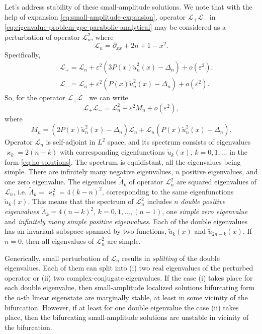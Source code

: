 Let's address stability of these small-amplitude solutions.
We note that with the help of expansion \eqref{eq:small-amplitude-expansion}, operator $\mathcal{L}_+ \mathcal{L}_-$ in \eqref{eq:eigenvalue-problem-gpe-parabolic-analytical} may be considered as a perturbation of operator $\mathcal{L}_n^2$, where
\begin{equation}
	\mathcal{L}_n = \partial_{xx} + 2n + 1 - x^2.
\end{equation}
Specifically,
\begin{eqnarray*}
	&& \mathcal{L}_+ = \mathcal{L}_n + \varepsilon^2 (3 P(x) \tilde{u}_n^2(x) - \Delta_n) + o(\varepsilon^2); \\
	&& \mathcal{L}_- = \mathcal{L}_n + \varepsilon^2 (P(x) \tilde{u}_n^2(x) - \Delta_n) + o(\varepsilon^2).
\end{eqnarray*}
So, for the operator $\mathcal{L}_+ \mathcal{L}_-$ we can write
\begin{equation}
	\mathcal{L}_+ \mathcal{L}_- = \mathcal{L}_n^2 + \varepsilon^2 M_n + o(\varepsilon^2),
\label{eq:perturbed-operator}
\end{equation}
where
\begin{equation}
	M_n = (2 P(x) \tilde{u}_n^2(x) - \Delta_n) \mathcal{L}_n + \mathcal{L}_n (P(x) \tilde{u}_n^2(x) - \Delta_n).
\label{eq:Mn}
\end{equation}
Operator $\mathcal{L}_n$ is self-adjoint in $L^2$ space, and its spectrum consists of eigenvalues $\varkappa_k = 2(n - k)$ with corresponding eigenfunctions $\tilde{u}_k(x)$, $k = 0, 1, \dots$  in the form \eqref{eq:ho-solutions}.
The spectrum is equidistant, all the eigenvalues being simple.
There are infinitely many negative eigenvalues, $n$ positive eigenvalues, and one zero eigenvalue.
The eigenvalues $\widetilde{\Lambda}_k$ of operator $\mathcal{L}_n^2$ are squared eigenvalues of $\mathcal{L}_n$, i.e. $\widetilde{\Lambda}_k = \varkappa_k^2 = 4 (k - n)^2$, corresponding to the same eigenfunctions $\tilde{u}_k(x)$.
This means that the spectrum of $\mathcal{L}_n^2$ includes $n$ {\it double positive eigenvalues} $\widetilde{\Lambda}_k = 4 (n - k)^2$, $k = 0, 1, \dots, (n - 1)$, one {\it simple zero eigenvalue} and {\it infinitely many simple positive eigenvalues}.
Each of the double eigenvalues has an invariant subspace spanned by two functions, $\tilde{u}_k(x)$ and $\tilde{u}_{2n - k}(x)$.
If $n = 0$, then all eigenvalues of $\mathcal{L}_n^2$ are simple.

Generically, small perturbation of $\mathcal{L}_n$ results in {\it splitting} of the double eigenvalues.
Each of them can split into (i) two real eigenvalues of the perturbed operator or (ii) two complex-conjugate eigenvalues.
If the case (i) takes place for each double eigenvalue, then small-amplitude localized solutions bifurcating form the $n$-th linear eigenstate are marginally stable, at least in some vicinity of the bifurcation.
However, if at least for one double eigenvalue the case (ii) takes place, then the bifurcating small-amplitude solutions  are unstable in vicinity of the bifurcation.

